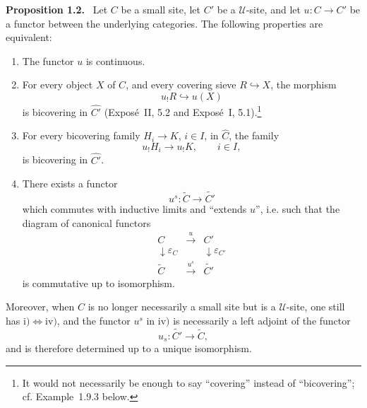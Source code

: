 \documentclass[11pt]{article}
\newcommand{\U}{\mathcal{U}}
\newenvironment{statement}[1]{\par\medskip\noindent\textbf{#1.}\ }{\par\medskip}
\begin{document}
\begin{statement}{Proposition 1.2}
Let \(C\) be a small site, let \(C'\) be a \(\U\)-site, and let \(u:C\to C'\) be a functor between the underlying categories. The following properties are equivalent:
\begin{enumerate}[label=\roman*)]
\item The functor \(u\) is continuous.

\item For every object \(X\) of \(C\), and every covering sieve \(R\hookrightarrow X\), the morphism
\[
u_!R\hookrightarrow u(X)
\]
is bicovering in \(\widehat {C'}\) (Expos\'e~II, 5.2 and Expos\'e~I, 5.1).\footnote{It would not necessarily be enough to say ``covering'' instead of ``bicov\-ering''; cf. Example~1.9.3 below.}

\item For every bicovering family \(H_i\to K\), \(i\in I\), in \(\widehat C\), the family
\[
u_!H_i\longrightarrow u_!K,
\qquad i\in I,
\]
is bicovering in \(\widehat {C'}\).

\item There exists a functor
\[
u^s:\widetilde C\longrightarrow \widetilde {C'}
\]
which commutes with inductive limits and ``extends \(u\)'', i.e. such that the diagram of canonical functors
\[
\begin{array}{ccc}
C&\xrightarrow{\ u\ }&C'\\
\downarrow{\scriptstyle\varepsilon_C}&&\downarrow{\scriptstyle\varepsilon_{C'}}\\
\widetilde C&\xrightarrow{\ u^s\ }&\widetilde {C'}
\end{array}
\]
is commutative up to isomorphism.
\end{enumerate}
Moreover, when \(C\) is no longer necessarily a small site but is a \(\U\)-site, one still has \(\mathrm{i)}\Leftrightarrow\mathrm{iv)}\), and the functor \(u^s\) in \(\mathrm{iv)}\) is necessarily a left adjoint of the functor
\[
u_s:\widetilde {C'}\longrightarrow \widetilde C,
\]
and is therefore determined up to a unique isomorphism.
\end{statement}
\end{document}
